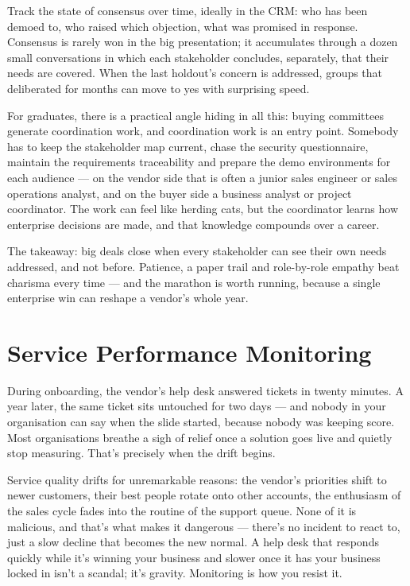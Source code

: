 Track the state of consensus over time, ideally in the CRM: who has been demoed to, who raised which objection, what was promised in response. Consensus is rarely won in the big presentation; it accumulates through a dozen small conversations in which each stakeholder concludes, separately, that their needs are covered. When the last holdout's concern is addressed, groups that deliberated for months can move to yes with surprising speed.


For graduates, there is a practical angle hiding in all this: buying committees generate coordination work, and coordination work is an entry point. Somebody has to keep the stakeholder map current, chase the security questionnaire, maintain the requirements traceability and prepare the demo environments for each audience — on the vendor side that is often a junior sales engineer or sales operations analyst, and on the buyer side a business analyst or project coordinator. The work can feel like herding cats, but the coordinator learns how enterprise decisions are made, and that knowledge compounds over a career.


The takeaway: big deals close when every stakeholder can see their own needs addressed, and not before. Patience, a paper trail and role-by-role empathy beat charisma every time — and the marathon is worth running, because a single enterprise win can reshape a vendor's whole year.

\section{Service Performance Monitoring}
During onboarding, the vendor's help desk answered tickets in twenty minutes. A year later, the same ticket sits untouched for two days — and nobody in your organisation can say when the slide started, because nobody was keeping score. Most organisations breathe a sigh of relief once a solution goes live and quietly stop measuring. That's precisely when the drift begins.


Service quality drifts for unremarkable reasons: the vendor's priorities shift to newer customers, their best people rotate onto other accounts, the enthusiasm of the sales cycle fades into the routine of the support queue. None of it is malicious, and that's what makes it dangerous — there's no incident to react to, just a slow decline that becomes the new normal. A help desk that responds quickly while it's winning your business and slower once it has your business locked in isn't a scandal; it's gravity. Monitoring is how you resist it.



